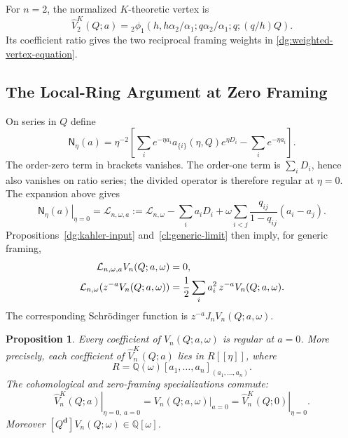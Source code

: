 \documentclass[11pt]{amsart}
\newtheorem{proposition}[theorem]{Proposition}
\theoremstyle{definition}
\theoremstyle{remark}
\numberwithin{equation}{section}
\newcommand{\Q}{\mathbb Q}
\begin{document}
For $n=2$, the normalized $K$-theoretic vertex is
\[
 \widehat V_2^K(Q;a)={}_2\phi_1
 \left(h,h\alpha_2/\alpha_1;
 q\alpha_2/\alpha_1;q;(q/h)Q\right).
\]
Its coefficient ratio gives the two reciprocal framing weights
in \eqref{dg:weighted-vertex-equation}.

\subsection{The Local-Ring Argument at Zero Framing}
On series in $Q$ define
\begin{equation}\label{dg:generic-divided-operator}
 \mathsf N_\eta(a)=\eta^{-2}
 \left[\sum_i e^{-\eta a_i}a_{\{i\}}(\eta,Q)e^{\eta D_i}
 -\sum_i e^{-\eta a_i}\right].
\end{equation}
The order-zero term in brackets vanishes. The order-one term is
$\sum_iD_i$, hence also vanishes on ratio series; the divided
operator is therefore regular at $\eta=0$. The expansion above
gives
\begin{equation}\label{dg:generic-vertex-equation}
 \left.\mathsf N_\eta(a)\right|_{\eta=0}
 =\mathcal L_{n,\omega,a}
 :=\mathcal L_{n,\omega}-\sum_i a_iD_i
 +\omega\sum_{i<j}\frac{q_{ij}}{1-q_{ij}}(a_i-a_j).
\end{equation}
Propositions~\ref{dg:kahler-input} and~\ref{cl:generic-limit}
then imply, for generic framing,
\begin{align}\label{dg:generic-cohomological-vertex}
 \mathcal L_{n,\omega,a}V_n(Q;a,\omega)&=0,\\
 \mathcal L_{n,\omega}(z^{-a}V_n(Q;a,\omega))
 &=\frac12\sum_i a_i^2\,z^{-a}V_n(Q;a,\omega).\notag
\end{align}
The corresponding Schr\"odinger function is
$z^{-a}J_nV_n(Q;a,\omega)$.

\begin{proposition}\label{dg:vertex-regularity}
Every coefficient of $V_n(Q;a,\omega)$ is regular at $a=0$.
More precisely, each coefficient of $\widehat V_n^K(Q;a)$ lies in
$R[[\eta]]$, where
\[
 R=\Q(\omega)[a_1,\ldots,a_n]_{(a_1,\ldots,a_n)}.
\]
The cohomological and zero-framing specializations commute:
\begin{equation}\label{dg:joint-regularity}
 \left.\widehat V_n^K(Q;a)\right|_{\eta=0,\ a=0}
 =\left.V_n(Q;a,\omega)\right|_{a=0}
 =\left.\widehat V_n^K(Q;0)\right|_{\eta=0}.
\end{equation}
Moreover $[Q^{\boldsymbol d}]V_n(Q;\omega)\in\Q[\omega]$.
\end{proposition}
\end{document}
